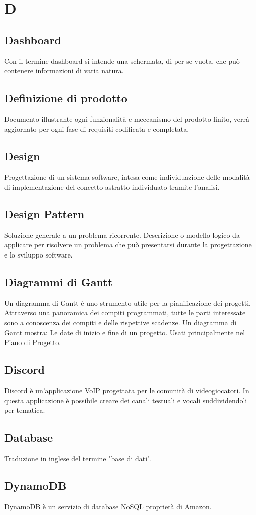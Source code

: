 \section{D}
	\subsection{Dashboard}  
		Con il termine dashboard si intende una schermata, di per se vuota, che può contenere informazioni di varia natura.
	\subsection{Definizione di prodotto}
		Documento illustrante ogni funzionalità e meccanismo del prodotto finito, verrà aggiornato per ogni fase di requisiti codificata e completata.
	\subsection{Design}  
		Progettazione di un sistema software, intesa come individuazione delle modalità di implementazione del concetto astratto individuato tramite l'analisi.
	\subsection{Design Pattern}
		Soluzione generale a un problema ricorrente. Descrizione o modello logico da applicare per risolvere un problema che può presentarsi durante la progettazione e lo sviluppo software.
	\subsection{Diagrammi di Gantt}
		Un diagramma di Gantt è uno strumento utile per la pianificazione dei progetti. Attraverso una panoramica dei compiti programmati, tutte le parti interessate sono a conoscenza dei compiti e delle rispettive scadenze. Un diagramma di Gantt mostra: Le date di inizio e fine di un progetto.
		Usati principalmente nel Piano di Progetto.
	\subsection{Discord}  
		Discord è un'applicazione VoIP progettata per le comunità di videogiocatori. In questa applicazione è possibile creare dei canali testuali e vocali suddividendoli per tematica. 
    \subsection{Database}
        Traduzione in inglese del termine "base di dati".
    \subsection{DynamoDB}
        DynamoDB è un servizio di database NoSQL proprietà di Amazon.
\newpage